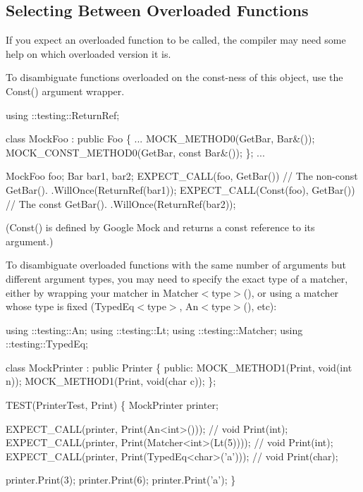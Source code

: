 \subsection*{Selecting Between Overloaded Functions}

If you expect an overloaded function to be called, the compiler may need some help on which overloaded version it is.

To disambiguate functions overloaded on the const-\/ness of this object, use the {\ttfamily Const()} argument wrapper.


\begin{DoxyCode}
using ::testing::ReturnRef;

\textcolor{keyword}{class }MockFoo : \textcolor{keyword}{public} Foo \{
  ...
  MOCK\_METHOD0(GetBar, Bar&());
  MOCK\_CONST\_METHOD0(GetBar, \textcolor{keyword}{const} Bar&());
\};
...

  MockFoo foo;
  Bar bar1, bar2;
  EXPECT\_CALL(foo, GetBar())         \textcolor{comment}{// The non-const GetBar().}
      .WillOnce(ReturnRef(bar1));
  EXPECT\_CALL(Const(foo), GetBar())  \textcolor{comment}{// The const GetBar().}
      .WillOnce(ReturnRef(bar2));
\end{DoxyCode}


({\ttfamily Const()} is defined by Google Mock and returns a {\ttfamily const} reference to its argument.)

To disambiguate overloaded functions with the same number of arguments but different argument types, you may need to specify the exact type of a matcher, either by wrapping your matcher in {\ttfamily Matcher$<$type$>$()}, or using a matcher whose type is fixed ({\ttfamily Typed\+Eq$<$type$>$}, {\ttfamily An$<$type$>$()}, etc)\+:


\begin{DoxyCode}
using ::testing::An;
using ::testing::Lt;
using ::testing::Matcher;
using ::testing::TypedEq;

\textcolor{keyword}{class }MockPrinter : \textcolor{keyword}{public} Printer \{
 \textcolor{keyword}{public}:
  MOCK\_METHOD1(Print, \textcolor{keywordtype}{void}(\textcolor{keywordtype}{int} n));
  MOCK\_METHOD1(Print, \textcolor{keywordtype}{void}(\textcolor{keywordtype}{char} c));
\};

TEST(PrinterTest, Print) \{
  MockPrinter printer;

  EXPECT\_CALL(printer, Print(An<int>()));            \textcolor{comment}{// void Print(int);}
  EXPECT\_CALL(printer, Print(Matcher<int>(Lt(5))));  \textcolor{comment}{// void Print(int);}
  EXPECT\_CALL(printer, Print(TypedEq<char>(\textcolor{charliteral}{'a'})));   \textcolor{comment}{// void Print(char);}

  printer.Print(3);
  printer.Print(6);
  printer.Print(\textcolor{charliteral}{'a'});
\}
\end{DoxyCode}


